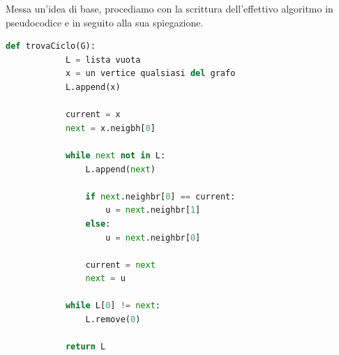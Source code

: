 \documentclass[12pt]{report}
\begin{document}
	Messa un'idea di base, procediamo con la scrittura dell'effettivo algoritmo in pseudocodice e in seguito alla sua spiegazione.
	
	\begin{lstlisting}[language=Python, caption={Pseudocidice per la ricerca di un ciclo all'interno di un grafo.}]
		def trovaCiclo(G):
			L = lista vuota
			x = un vertice qualsiasi del grafo
			L.append(x)
			
			current = x
			next = x.neigbh[0]
			
			while next not in L:
				L.append(next)
				
				if next.neighbr[0] == current:
					u = next.neighbr[1]
				else:
					u = next.neighbr[0]
					
				current = next
				next = u
				
			while L[0] != next:
				L.remove(0)
				
			return L
	\end{lstlisting}
	
\end{document}
